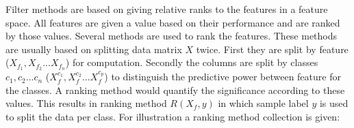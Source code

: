 \documentclass[10pt,a4paper]{article}
\begin{document}
	Filter methods are based on giving relative ranks to the features in a feature space. All features are given a value based on their performance and are ranked by those values\cite{Duch2006, saeys2007review}. Several methods are used to rank the features. These methods are usually based on splitting data matrix $X$ twice. First they are split by feature ($X_{f_1}, X_{f_2} ... X_{f_n}$) for computation. Secondly the columns are split by classes $c_1, c_2 ... c_n$ ($X_{f}^{c_1}, X_{f}^{c_2} ... X_{f}^{c_p}$) to distinguish the predictive power between feature for the classes. A ranking method would quantify the significance according to these values. This results in ranking method $R(X_f, y)$ in which sample label $y$ is used to split the data per class. For illustration a ranking method collection is given:
	
\end{document}
